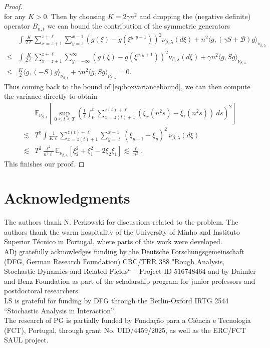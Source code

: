 \documentclass[a4paper, reqno, 12pt]{amsart}
\theoremstyle{plain}
\theoremstyle{definition}
\newcommand{\parent}[1]{\left( #1 \right)}
\newcommand{\ee}[1]{\mathbb{E}_{\nu_{\beta,\lambda}}\left[ #1 \right]}
\begin{document}
\begin{proof}
\begin{equation*}
\end{equation*}
for any $K>0$. Then by choosing $K =2\gamma n^2 $ and dropping the (negative definite) operator $B_{n,t}$ we can bound the contribution of the symmetric generators
\begin{equation*}
\begin{split}
    &\int \frac{K}{2\ell} \sum_{x=z+1 }^{z+\ell} \sum_{y = z}^{x-1} (g(\xi)- g(\xi^{y,y+1}))^2 \nu_{\beta,\lambda}(d\xi) + n^2  \langle g,(\gamma S +\mathcal{B})g \rangle_{\nu_{\beta,\lambda}}  \\ 
    \leq  &\int \frac{K}{2\ell} \sum_{x=z+1 }^{z+\ell} \sum_{y = -{\infty}}^{\infty} (g(\xi)- g(\xi^{y,y+1}))^2 \nu_{\beta,\lambda}(d\xi) + \gamma n^2  \langle g, S g \rangle_{\nu_{\beta,\lambda}}\\
    \leq & \frac{K}{2}\langle g, (-S) g \rangle_{\nu_{\beta,\lambda}} + \gamma n^2  \langle g, S g \rangle_{\nu_{\beta,\lambda}} = 0.
\end{split}
\end{equation*} 
Thus coming back to the bound of \eqref{eq:boxvariancebound}, we can then compute the variance directly to obtain
\begin{equation*}
\begin{split}
    &\ee{\sup_{0\leq t\leq T} \parent{\frac{1}{\ell}\int_0^t \sum_{x=z(t)+1 }^{z(t)+\ell}(\xi_{x}(n^2 s) -\xi_\ell(n^2 s))\  ds }^2}\\
    \lesssim&   T^2\int \frac{1}{K\ell} \sum_{x=z(t)+1 }^{z(t)+\ell} \sum_{y = \ell}^{x-1} (\xi_{y+1} -\xi_y)^2 \ \nu_{\beta,\lambda}(d\xi)    \\
    \lesssim &  T^2\frac{\ell^2}{ n^2 \ell} \ee{\xi_{2}^2 + \xi_{1}^2 - 2\xi_{2}\xi_{1}} \lesssim \frac{\ell}{n^2}.
\end{split}
\end{equation*}
This finishes our proof.
\end{proof}

\section*{Acknowledgments}

The authors thank N. Perkowski for discussions related to the problem. The authors thank the warm hospitality of the University of Minho and Instituto Superior Técnico in Portugal, where parts of this work were developed.\\
ADj gratefully acknowledges  funding by the Deutsche Forschungsgemeinschaft (DFG, German Research Foundation) CRC/TRR 388 "Rough Analysis, Stochastic Dynamics and Related Fields“ – Project ID 516748464 and by Daimler and Benz Foundation as part of the scholarship program for junior professors and postdoctoral researchers.\\
LS is grateful for funding by DFG through the Berlin-Oxford IRTG 2544 “Stochastic Analysis in Interaction”. \\
The research of PG is partially funded by Fundação para a Ciência e Tecnologia (FCT), Portugal, through grant No. UID/4459/2025, as well as the ERC/FCT SAUL project.
\end{document}
